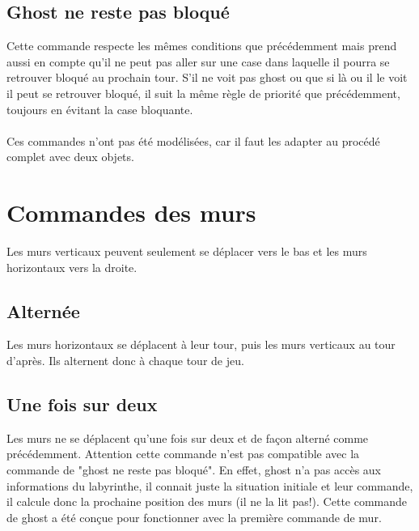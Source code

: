 \subsection{Ghost ne reste pas bloqué}
Cette commande respecte les mêmes conditions que précédemment mais prend aussi en compte qu'il ne peut pas aller sur une case dans laquelle il pourra se retrouver bloqué au prochain tour. S'il ne voit pas ghost ou que si là ou il le voit il peut se retrouver bloqué, il suit la même règle de priorité que précédemment, toujours en évitant la case bloquante.\\
\\
Ces commandes n'ont pas été modélisées, car il faut les adapter au procédé complet avec deux objets.

\section{Commandes des murs}\label{sec:commandeMurs}
Les murs verticaux peuvent seulement se déplacer vers le bas et les murs horizontaux vers la droite.
\subsection{Alternée}
Les murs horizontaux se déplacent à leur tour, puis les murs verticaux au tour d'après. Ils alternent donc à chaque tour de jeu.
\subsection{Une fois sur deux}
Les murs ne se déplacent qu'une fois sur deux et de façon alterné comme précédemment. Attention cette commande n'est pas compatible avec la commande de "ghost ne reste pas bloqué". En effet, ghost n'a pas accès aux informations du labyrinthe, il connait juste la situation initiale et leur commande, il calcule donc la prochaine position des murs (il ne la lit pas!). Cette commande de ghost a été conçue pour fonctionner avec la première commande de mur.


